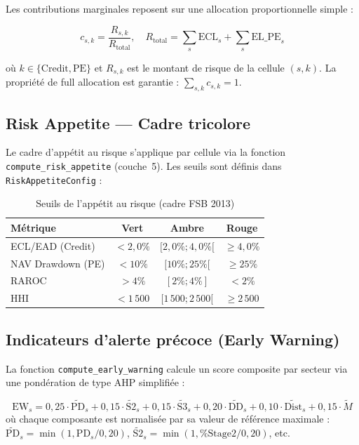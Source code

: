 \documentclass[12pt,a4paper]{article}
\begin{document}
Les contributions marginales reposent sur une allocation proportionnelle simple :

\begin{equation}
    c_{s,k} = \frac{R_{s,k}}{R_{\text{total}}}, \quad
    R_{\text{total}} = \sum_s \text{ECL}_s + \sum_s \text{EL\_PE}_s
    \label{eq:marginal}
\end{equation}

o\`u $k \in \{\text{Credit}, \text{PE}\}$ et $R_{s,k}$ est le montant de risque
de la cellule $(s, k)$. La propri\'et\'e de full allocation est garantie :
$\sum_{s,k} c_{s,k} = 1$.

\subsection{Risk Appetite --- Cadre tricolore}

Le cadre d'app\'etit au risque s'applique par cellule via la fonction
\texttt{compute\_risk\_appetite} (couche~5). Les seuils sont d\'efinis dans
\texttt{RiskAppetiteConfig} :

\begin{table}[htbp]
\centering
\caption{Seuils de l'app\'etit au risque (cadre FSB 2013)}
\begin{tabular}{lccc}
\toprule
\textbf{M\'etrique} & \textcolor{accentgreen}{\textbf{Vert}} & \textcolor{accentorange}{\textbf{Ambre}} & \textcolor{accentred}{\textbf{Rouge}} \\
\midrule
ECL/EAD (Credit) & $< 2{,}0\%$ & $[2{,}0\% ; 4{,}0\%[$ & $\geq 4{,}0\%$ \\
NAV Drawdown (PE) & $< 10\%$ & $[10\% ; 25\%[$ & $\geq 25\%$ \\
RAROC & $> 4\%$ & $[2\% ; 4\%]$ & $< 2\%$ \\
HHI & $< 1\,500$ & $[1\,500 ; 2\,500[$ & $\geq 2\,500$ \\
\bottomrule
\end{tabular}
\label{tab:risk_appetite}
\end{table}

\subsection{Indicateurs d'alerte pr\'ecoce (Early Warning)}

La fonction \texttt{compute\_early\_warning} calcule un score composite par secteur
via une pond\'eration de type AHP simplifi\'ee :

\begin{formulebox}
\begin{equation}
    \text{EW}_s = 0{,}25 \cdot \widetilde{\text{PD}}_s
    + 0{,}15 \cdot \widetilde{\text{S2}}_s
    + 0{,}15 \cdot \widetilde{\text{S3}}_s
    + 0{,}20 \cdot \widetilde{\text{DD}}_s
    + 0{,}10 \cdot \widetilde{\text{Dist}}_s
    + 0{,}15 \cdot \widetilde{M}
    \label{eq:early_warning}
\end{equation}
o\`u chaque composante est normalis\'ee par sa valeur de r\'ef\'erence maximale :
$\widetilde{\text{PD}}_s = \min(1, \text{PD}_s / 0{,}20)$, \quad
$\widetilde{\text{S2}}_s = \min(1, \%\text{Stage2} / 0{,}20)$, etc.
\end{formulebox}
\end{document}
